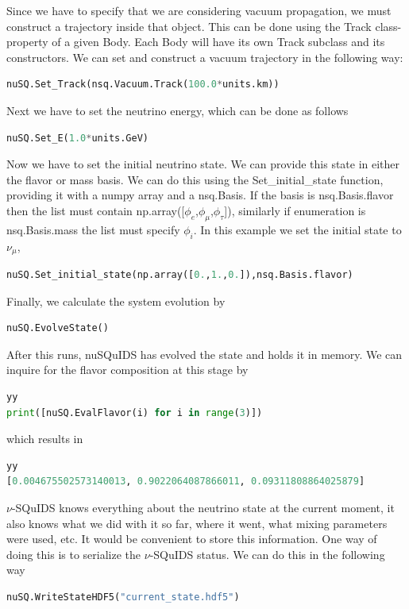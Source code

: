 \documentclass[3p,12pt]{elsarticle}
\newcommand{\ttf}{\ttfamily}
\begin{document}
Since we have to specify that we are considering vacuum propagation, 
we must construct a trajectory inside that object. This can be done using the {\ttf Track} class-property of a given {\ttf Body}.
Each {\ttf Body} will have its own {\ttf Track} subclass and its constructors. We can set and construct a vacuum trajectory in the following way:
\begin{lstlisting}[language=Python, breaklines=true]
nuSQ.Set_Track(nsq.Vacuum.Track(100.0*units.km))
\end{lstlisting}

Next we have to set the neutrino energy, which can be done as follows
\begin{lstlisting}[language=Python, breaklines=true]
nuSQ.Set_E(1.0*units.GeV)
\end{lstlisting}

Now we have to set the initial neutrino state. We can provide this state in either the flavor or mass basis.
We can do this using the {\ttf Set\_initial\_state} function, providing it with a numpy array and a {\ttf nsq.Basis}.
If the basis is {\ttf nsq.Basis.flavor} then the list must contain {\ttf np.array([}$\phi_e$,$\phi_\mu$,$\phi_\tau${\ttf ])}, 
similarly if enumeration is {\ttf nsq.Basis.mass} the list must specify $\phi_i$.
In this example we set the initial state to $\nu_\mu$,
\begin{lstlisting}[language=Python, breaklines=true]
nuSQ.Set_initial_state(np.array([0.,1.,0.]),nsq.Basis.flavor)
\end{lstlisting}

Finally, we calculate the system evolution by
\begin{lstlisting}[language=Python, breaklines=true]
nuSQ.EvolveState()
\end{lstlisting}

After this runs, {\ttf nuSQuIDS} has evolved the state and holds it in memory.
We can inquire for the flavor composition at this stage by
\begin{lstlisting}[language=Python, breaklines=true]yy
print([nuSQ.EvalFlavor(i) for i in range(3)])
\end{lstlisting}

which results in
\begin{lstlisting}[language=Python, breaklines=true]yy
[0.004675502573140013, 0.9022064087866011, 0.09311808864025879]
\end{lstlisting}

$\nu$-SQuIDS knows everything about the neutrino state at the current moment, it also knows what we did with it so far, where it went, what mixing parameters were used, etc. It would be convenient to store this information. One way of doing this is to serialize the $\nu$-SQuIDS status. We can do this in the following way
\begin{lstlisting}[language=Python, breaklines=true]
nuSQ.WriteStateHDF5("current_state.hdf5")
\end{lstlisting}
\end{document}
